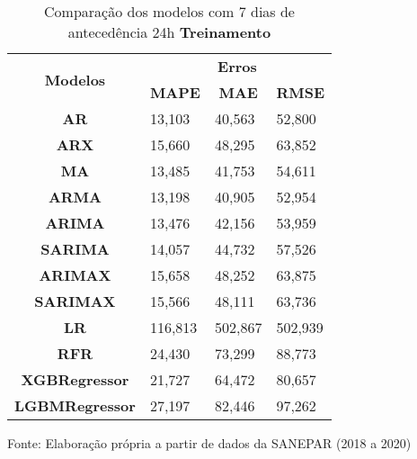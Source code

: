 \begin{table}[H]
	\centering
	\caption{Comparação dos modelos com 7 dias de antecedência 24h \textbf{Treinamento} }\label{tb:10-24trn}
	\begin{tabular}{@{}clll@{}}
		\toprule
		\multirow{2}{*}{\textbf{Modelos}} & \multicolumn{3}{c}{\textbf{Erros}}                                                                       \\ \cmidrule(l){2-4} 
		& \multicolumn{1}{c}{\textbf{MAPE}} & \multicolumn{1}{c}{\textbf{MAE}} & \multicolumn{1}{c}{\textbf{RMSE}} \\ \hline
\textbf{AR}                       & 13,103                            & 40,563                           & 52,800                            \\
\textbf{ARX}                      & 15,660                            & 48,295                           & 63,852                            \\
\textbf{MA}                       & 13,485                            & 41,753                           & 54,611                            \\
\textbf{ARMA}                     & 13,198                            & 40,905                           & 52,954                            \\
\textbf{ARIMA}                    & 13,476                            & 42,156                           & 53,959                            \\
\textbf{SARIMA}                   & 14,057                            & 44,732                           & 57,526                            \\
\textbf{ARIMAX}                   & 15,658                            & 48,252                           & 63,875                            \\
\textbf{SARIMAX}                  & 15,566                            & 48,111                           & 63,736                            \\
\textbf{LR}        & 116,813                           & 502,867                          & 502,939                           \\
\textbf{RFR}  & 24,430                            & 73,299                           & 88,773                            \\
\textbf{XGBRegressor}             & 21,727                            & 64,472                           & 80,657                            \\
\textbf{LGBMRegressor}            & 27,197                            & 82,446                           & 97,262                            \\ \bottomrule
	\end{tabular}

Fonte: Elaboração própria a partir de dados da SANEPAR (2018 a 2020)
\end{table}

